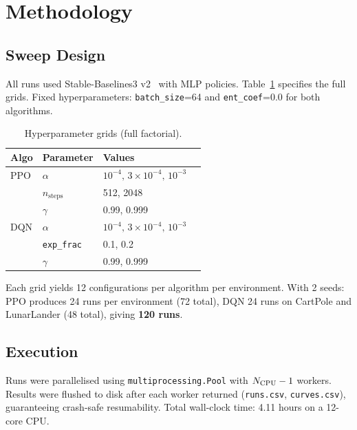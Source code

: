 \documentclass[10pt, a4paper, twocolumn]{article}
\begin{document}
\section{Methodology}

\subsection{Sweep Design}

All runs used Stable-Baselines3 v2~\cite{raffin2021stable} with MLP policies.
Table~\ref{tab:grids} specifies the full grids.
Fixed hyperparameters: \texttt{batch\_size}=64 and \texttt{ent\_coef}=0.0 for
both algorithms.

\begin{table}[H]
\centering
\caption{Hyperparameter grids (full factorial).}
\label{tab:grids}
\setlength{\tabcolsep}{4pt}
\begin{tabular}{llll}
\toprule
\textbf{Algo} & \textbf{Parameter} & \textbf{Values} \\
\midrule
PPO & $\alpha$ & $10^{-4},\,3\!\times\!10^{-4},\,10^{-3}$ \\
    & $n_\mathrm{steps}$ & 512, 2048 \\
    & $\gamma$            & 0.99, 0.999 \\
\midrule
DQN & $\alpha$ & $10^{-4},\,3\!\times\!10^{-4},\,10^{-3}$ \\
    & \texttt{exp\_frac} & 0.1, 0.2 \\
    & $\gamma$ & 0.99, 0.999 \\
\bottomrule
\end{tabular}
\end{table}

Each grid yields 12 configurations per algorithm per environment.
With 2 seeds: PPO produces 24 runs per environment (72 total), DQN 24 runs on
CartPole and LunarLander (48 total), giving \textbf{120 runs}.

\subsection{Execution}

Runs were parallelised using \texttt{multiprocessing.Pool} with $N_{\rm CPU}-1$
workers.
Results were flushed to disk after each worker returned
(\texttt{runs.csv}, \texttt{curves.csv}), guaranteeing crash-safe resumability.
Total wall-clock time: 4.11 hours on a 12-core CPU.
\end{document}
